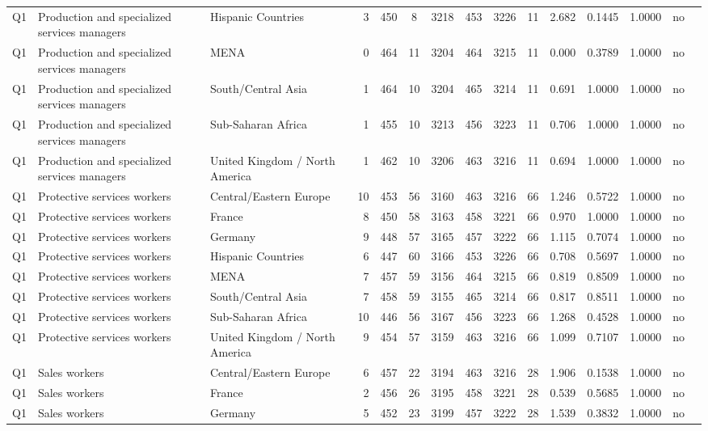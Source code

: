 \begin{longtable}{lllrcccccccccll}
Q1 & Production and specialized services managers & Hispanic Countries & 3 & 450 & 8 & 3218 & 453 & 3226 & 11 & 2.682 & 0.1445 & 1.0000 & no \\
Q1 & Production and specialized services managers & MENA & 0 & 464 & 11 & 3204 & 464 & 3215 & 11 & 0.000 & 0.3789 & 1.0000 & no \\
Q1 & Production and specialized services managers & South/Central Asia & 1 & 464 & 10 & 3204 & 465 & 3214 & 11 & 0.691 & 1.0000 & 1.0000 & no \\
Q1 & Production and specialized services managers & Sub-Saharan Africa & 1 & 455 & 10 & 3213 & 456 & 3223 & 11 & 0.706 & 1.0000 & 1.0000 & no \\
Q1 & Production and specialized services managers & United Kingdom / North America & 1 & 462 & 10 & 3206 & 463 & 3216 & 11 & 0.694 & 1.0000 & 1.0000 & no \\
Q1 & Protective services workers & Central/Eastern Europe & 10 & 453 & 56 & 3160 & 463 & 3216 & 66 & 1.246 & 0.5722 & 1.0000 & no \\
Q1 & Protective services workers & France & 8 & 450 & 58 & 3163 & 458 & 3221 & 66 & 0.970 & 1.0000 & 1.0000 & no \\
Q1 & Protective services workers & Germany & 9 & 448 & 57 & 3165 & 457 & 3222 & 66 & 1.115 & 0.7074 & 1.0000 & no \\
Q1 & Protective services workers & Hispanic Countries & 6 & 447 & 60 & 3166 & 453 & 3226 & 66 & 0.708 & 0.5697 & 1.0000 & no \\
Q1 & Protective services workers & MENA & 7 & 457 & 59 & 3156 & 464 & 3215 & 66 & 0.819 & 0.8509 & 1.0000 & no \\
Q1 & Protective services workers & South/Central Asia & 7 & 458 & 59 & 3155 & 465 & 3214 & 66 & 0.817 & 0.8511 & 1.0000 & no \\
Q1 & Protective services workers & Sub-Saharan Africa & 10 & 446 & 56 & 3167 & 456 & 3223 & 66 & 1.268 & 0.4528 & 1.0000 & no \\
Q1 & Protective services workers & United Kingdom / North America & 9 & 454 & 57 & 3159 & 463 & 3216 & 66 & 1.099 & 0.7107 & 1.0000 & no \\
Q1 & Sales workers & Central/Eastern Europe & 6 & 457 & 22 & 3194 & 463 & 3216 & 28 & 1.906 & 0.1538 & 1.0000 & no \\
Q1 & Sales workers & France & 2 & 456 & 26 & 3195 & 458 & 3221 & 28 & 0.539 & 0.5685 & 1.0000 & no \\
Q1 & Sales workers & Germany & 5 & 452 & 23 & 3199 & 457 & 3222 & 28 & 1.539 & 0.3832 & 1.0000 & no \\

\end{longtable}
